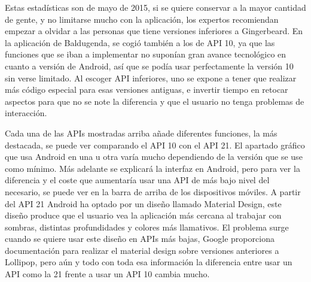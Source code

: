 Estas estadísticas son de mayo de 2015, si se quiere conservar a la mayor cantidad de gente, y no limitarse mucho con la aplicación, los expertos recomiendan empezar a olvidar a las personas que tiene versiones inferiores a Gingerbeard.
En la aplicación de Baldugenda, se cogió también a los de API 10, ya que las funciones que se iban a implementar no suponían gran avance tecnológico en cuanto a versión de Android, así que se podía usar perfectamente la versión 10 sin verse limitado.
Al escoger API inferiores, uno se expone a tener que realizar más código especial para esas versiones antiguas, e invertir tiempo en retocar aspectos para que no se note la diferencia y que el usuario no tenga problemas de interacción.

Cada una de las APIs mostradas arriba añade diferentes funciones, la más destacada, se puede ver comparando el API 10 con el API 21. El apartado gráfico que usa Android en una u otra varía mucho dependiendo de la versión que se use como mínimo.
Más adelante se explicará la interfaz en Android, pero para ver la diferencia y el coste que aumentaría usar una API de más bajo nivel del necesario, se puede ver en la barra de arriba de los dispositivos móviles. A partir del API 21 Android ha optado por un diseño llamado Material Design, este diseño produce que el usuario vea la aplicación más cercana al trabajar con sombras, distintas profundidades y colores más llamativos.
\newpage
El problema surge cuando se quiere usar este diseño en APIs más bajas, Google proporciona documentación para realizar el material design sobre versiones anteriores a Lollipop, pero aún y todo con toda esa información la diferencia entre usar un API como la 21 frente a usar un API 10 cambia mucho.

